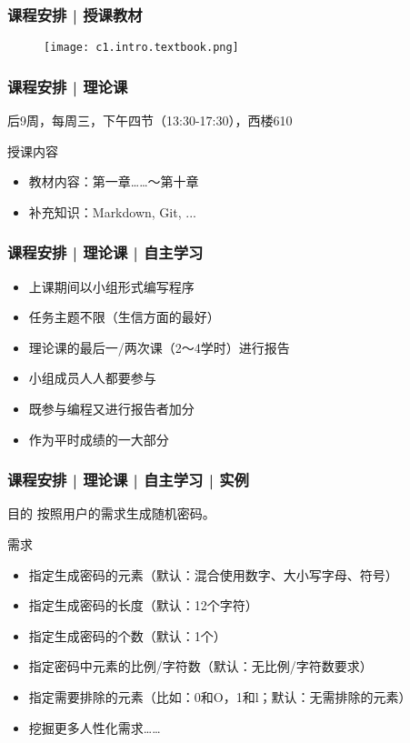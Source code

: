 \begin{frame}
  \frametitle{课程安排 | 授课教材}
  \begin{figure}
    \centering
    \texttt{[image: c1.intro.textbook.png]}
  \end{figure}
\end{frame}

\begin{frame}
  \frametitle{课程安排 | 理论课}
  \begin{center}
  \alert{后9周，每周三，下午四节（13:30-17:30），西楼610}\\
  \vspace{0.2cm}
  \end{center}
  \begin{block}{授课内容}
    \begin{itemize}
      \item 教材内容：第一章……～第十章
      \item 补充知识：Markdown, Git, ...
    \end{itemize}
  \end{block}
\end{frame}

\begin{frame}
  \frametitle{课程安排 | 理论课 | 自主学习}
  \begin{itemize}
    \item 上课期间以小组形式编写程序
    \item 任务主题不限（生信方面的最好）
    \item 理论课的最后一/两次课（2～4学时）进行报告
    \item 小组成员人人都要参与
    \item 既参与编程又进行报告者加分
    \item 作为平时成绩的一大部分
  \end{itemize}
\end{frame}

\begin{frame}
  \frametitle{课程安排 | 理论课 | 自主学习 | 实例}
  \begin{block}{目的}
    按照用户的需求生成随机密码。
  \end{block}
  \pause
  \begin{block}{需求}
    \begin{itemize}
      \item 指定生成密码的元素（默认：混合使用数字、大小写字母、符号）
      \item 指定生成密码的长度（默认：12个字符）
      \item 指定生成密码的个数（默认：1个）
      \item 指定密码中元素的比例/字符数（默认：无比例/字符数要求）
      \item 指定需要排除的元素（比如：0和O，1和l；默认：无需排除的元素）
      \item 挖掘更多人性化需求……
    \end{itemize}
  \end{block}
\end{frame}

